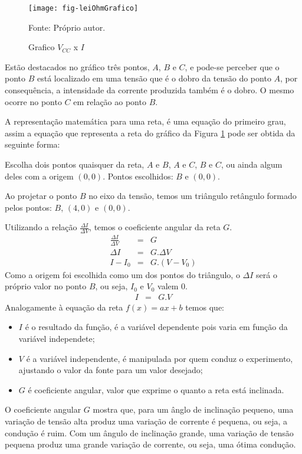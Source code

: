 \begin{figure}[H]
  \centering
  \caption{Grafico $V_{CC}$ x $I$}
  \label{fig:leiOhmGrafico}
  \texttt{[image: fig-leiOhmGrafico]}

  {\small Fonte: Próprio autor.}
\end{figure}

Estão destacados no gráfico três pontos, $A$, $B$ e $C$, e pode-se perceber que o ponto $B$ está localizado em uma tensão que é o dobro da tensão do ponto $A$, por consequência, a intensidade da corrente produzida também é o dobro. O mesmo ocorre no ponto $C$ em relação ao ponto $B$.

A representação matemática para uma reta, é uma equação do primeiro grau, assim a equação que representa a reta do gráfico da Figura \ref{fig:leiOhmGrafico} pode ser obtida da seguinte forma:

Escolha dois pontos quaisquer da reta, $A$ e $B$, $A$ e $C$, $B$ e $C$, ou ainda algum deles com a origem $(0,0)$.
Pontos escolhidos: $B$ e $(0,0)$.

Ao projetar o ponto $B$ no eixo da tensão, temos um triângulo retângulo formado pelos pontos: $B$, $(4,0)$ e $(0,0)$.

Utilizando a relação $\frac{\Delta I}{\Delta V}$, temos o coeficiente angular da reta $G$.
\vspace{-3mm}
\begin{eqnarray}
  \frac{\Delta I}{\Delta V} & = & G \nonumber \\
  \Delta I & = & G .\Delta V \nonumber \\
  I - I_0 & = & G . (V - V_0)
\end{eqnarray}
Como a origem foi escolhida como um dos pontos do triângulo, o $\Delta I$ será o próprio valor no ponto $B$, ou seja, $I_0$ e $V_0$ valem $0$.
\vspace{-3mm}
\begin{eqnarray}
  \label{eqn:leiOhmG}
  I & = & G . V
\end{eqnarray}
Analogamente à equação da reta $f(x) = ax + b$ temos que:
\begin{itemize}
\vspace{-3mm}
  \item $I$ é o resultado da função, é a variável dependente pois varia em função da variável independete;
  \item $V$ é a variável independente, é manipulada por quem conduz o experimento, ajustando o valor da fonte para um valor desejado;
  \item $G$ é coeficiente angular, valor que exprime o quanto a reta está inclinada.
\end{itemize}
\vspace{-3mm}
O coeficiente angular $G$ mostra que, para um ânglo de inclinação pequeno, uma variação de tensão alta produz uma variação de corrente é pequena, ou seja, a condução é ruim. Com um ângulo de inclinação grande, uma variação de tensão pequena produz uma grande variação de corrente, ou seja, uma ótima condução.


